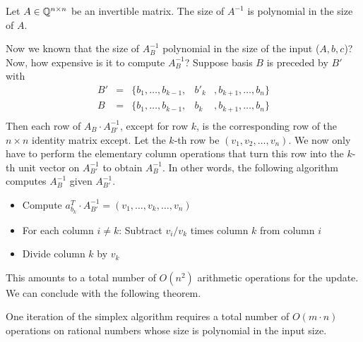 \begin{corollary}  
  Let $A \in \mathbb{Q}^{n\times n}$  be an invertible matrix. The size of $A^{-1}$
  is polynomial in the size of $A$. 
\end{corollary}


Now we known that the size of  $A_B^{-1}$ polynomial in the size of the input
($A,b,c$)?  Now, how  expensive is it to compute $A_B^{-1}$? 
Suppose basis $B$  is preceded by  $B'$ 
with 
\begin{displaymath}    
  \begin{array}{lcrcl}
    B'&=& \{b_1,\ldots,b_{k-1},& b'_{k}& ,b_{k+1},\ldots,b_n\} \\
    B &=& \{b_1,\ldots,b_{k-1},& b_{k}& ,b_{k+1},\ldots,b_n\} \\
  \end{array}
\end{displaymath}
Then  each row of  $A_B \cdot A_{B'}^{-1}$, except for row $k$, is the corresponding row of the $n\times n$ identity matrix except. Let the $k$-th row be $(v_1,v_2,\dots,v_n)$. We now only have to perform the elementary column operations that turn this row into the $k$-th unit vector on $A_{B'}^{-1}$ to obtain $A_B^{-1}$. In other words, the following algorithm computes $A_B^{-1}$ given $A_{B'}^{-1}$. 


\begin{itemize}
\item Compute $a_{b_k}^T \cdot A_{B'}^{-1} = (v_1,\ldots,v_k,\ldots,v_n)$ 
\item For each column $i \neq k$: Subtract $v_i / v_k$ times column
  $k$ from column $i$ 
\item Divide column $k$ by $v_k$ 
\end{itemize}

This amounts to a total number of $O(n^2)$ arithmetic operations for the update. 
We can conclude with the following theorem. 
\begin{theorem}
  \label{thr-a-4}
  One iteration of the simplex algorithm requires a total number of
  $O(m\cdot n)$ operations on rational numbers whose size is polynomial
  in the input size. 
\end{theorem}



